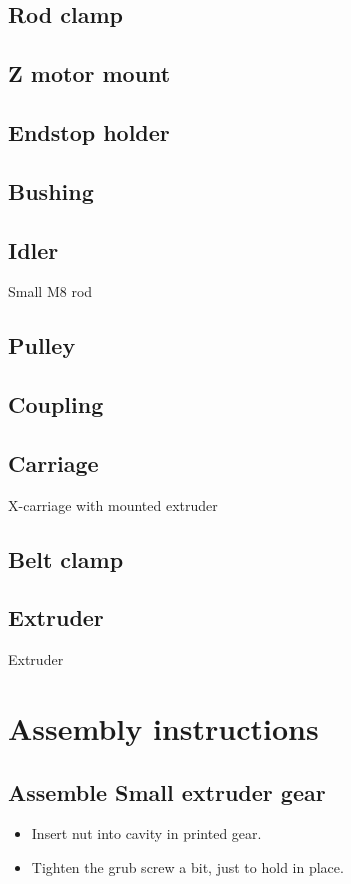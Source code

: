 \documentclass[11pt]{article}
\begin{document}
\subsection{Rod clamp}

\subsection{Z motor mount}

\subsection{Endstop holder}

\subsection{Bushing}

\subsection{Idler}
Small M8 rod

\subsection{Pulley}

\subsection{Coupling}

\subsection{Carriage}
X-carriage with mounted extruder

\subsection{Belt clamp}

\subsection{Extruder}
Extruder 
 
 

\newpage
\section{Assembly instructions}
\subsection{Assemble Small extruder gear}
\begin{itemize}
\item Insert nut into cavity in printed gear.
\item Tighten the grub screw a bit, just to hold in place.
\end{itemize}
\end{document}
